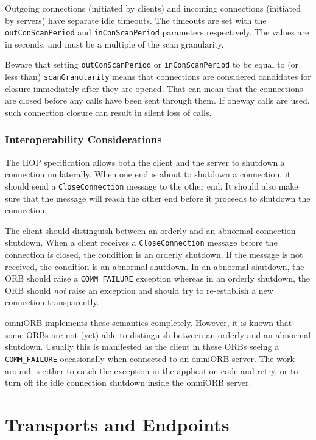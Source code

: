 \documentclass[11pt,oneside,a4paper]{book}
\newcommand{\code}[1]{\texttt{#1}}
\newcommand{\dsc}{\discretionary{}{}{}}
\begin{document}
Outgoing connections (initiated by clients) and incoming connections
(initiated by servers) have separate idle timeouts.  The timeouts are
set with the \code{outConScan\dsc{}Period} and \code{inConScanPeriod}
parameters respectively. The values are in seconds, and must be a
multiple of the scan granularity.

Beware that setting \code{outConScanPeriod} or \code{inConScanPeriod}
to be equal to (or less than) \code{scanGranularity} means that
connections are considered candidates for closure immediately after
they are opened. That can mean that the connections are closed before
any calls have been sent through them. If oneway calls are used, such
connection closure can result in silent loss of calls.


\subsection{Interoperability Considerations}

The IIOP specification allows both the client and the server to
shutdown a connection unilaterally. When one end is about to shutdown
a connection, it should send a \code{CloseConnection} message to the
other end. It should also make sure that the message will reach the
other end before it proceeds to shutdown the connection.

The client should distinguish between an orderly and an abnormal
connection shutdown. When a client receives a \code{CloseConnection}
message before the connection is closed, the condition is an orderly
shutdown.  If the message is not received, the condition is an
abnormal shutdown.  In an abnormal shutdown, the ORB should raise a
\code{COMM\_FAILURE} exception whereas in an orderly shutdown, the ORB
should \emph{not} raise an exception and should try to re-establish a
new connection transparently.

omniORB implements these semantics completely. However, it is known
that some ORBs are not (yet) able to distinguish between an orderly
and an abnormal shutdown. Usually this is manifested as the client in
these ORBs seeing a \code{COMM\_FAILURE} occasionally when connected
to an omniORB server. The work-around is either to catch the exception
in the application code and retry, or to turn off the idle connection
shutdown inside the omniORB server.



\chapter{Transports and Endpoints}
\label{chap:endpoints}
\end{document}
